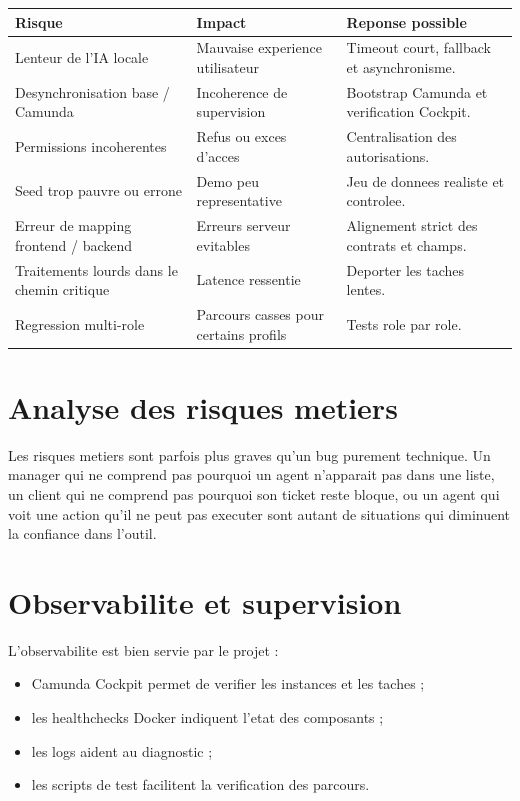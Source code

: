 \begin{longtable}{>{\raggedright\arraybackslash}p{4.4cm} >{\raggedright\arraybackslash}p{3cm} >{\raggedright\arraybackslash}p{5.1cm}}
\toprule
Risque & Impact & Reponse possible \\
\midrule
Lenteur de l'IA locale & Mauvaise experience utilisateur & Timeout court, fallback et asynchronisme. \\
Desynchronisation base / Camunda & Incoherence de supervision & Bootstrap Camunda et verification Cockpit. \\
Permissions incoherentes & Refus ou exces d'acces & Centralisation des autorisations. \\
Seed trop pauvre ou errone & Demo peu representative & Jeu de donnees realiste et controlee. \\
Erreur de mapping frontend / backend & Erreurs serveur evitables & Alignement strict des contrats et champs. \\
Traitements lourds dans le chemin critique & Latence ressentie & Deporter les taches lentes. \\
Regression multi-role & Parcours casses pour certains profils & Tests role par role. \\
\bottomrule
\end{longtable}

\section{Analyse des risques metiers}

Les risques metiers sont parfois plus graves qu'un bug purement technique. Un manager qui ne comprend pas pourquoi un agent n'apparait pas dans une liste, un client qui ne comprend pas pourquoi son ticket reste bloque, ou un agent qui voit une action qu'il ne peut pas executer sont autant de situations qui diminuent la confiance dans l'outil.

\section{Observabilite et supervision}

L'observabilite est bien servie par le projet :

\begin{itemize}[leftmargin=1.2cm]
  \item Camunda Cockpit permet de verifier les instances et les taches ;
  \item les healthchecks Docker indiquent l'etat des composants ;
  \item les logs aident au diagnostic ;
  \item les scripts de test facilitent la verification des parcours.
\end{itemize}

